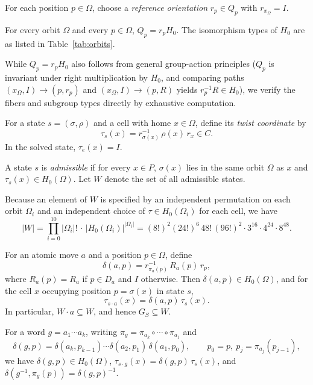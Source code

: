 \documentclass[a4paper,11pt]{article}
\begin{document}
For each position $p\in\Omega$, choose a \emph{reference orientation} $r_p\in Q_p$ with $r_{x_\Omega}=I$.

\begin{lemma}[Check C3]\label{lem:coset}
For every orbit $\Omega$ and every $p\in\Omega$, $Q_p=r_pH_0$.
The isomorphism types of $H_0$ are as listed in Table~\ref{tab:orbits}.
\end{lemma}

While $Q_p=r_pH_0$ also follows from general group-action principles ($Q_p$ is invariant under right multiplication by $H_0$, and comparing paths $(x_\Omega,I)\to(p,r_p)$ and $(x_\Omega,I)\to(p,R)$ yields $r_p^{-1}R\in H_0$), we verify the fibers and subgroup types directly by exhaustive computation.

\begin{definition}
For a state $s=(\sigma,\rho)$ and a cell with home $x\in\Omega$, define its \emph{twist coordinate} by
\[
\tau_s(x)=r_{\sigma(x)}^{-1}\,\rho(x)\,r_x\in C.
\]
In the solved state, $\tau_e(x)=I$.
\end{definition}

\begin{definition}
A state $s$ is \emph{admissible} if for every $x\in P$, $\sigma(x)$ lies in the same orbit $\Omega$ as $x$ and $\tau_s(x)\in H_0(\Omega)$. Let $W$ denote the set of all admissible states.
\end{definition}

Because an element of $W$ is specified by an independent permutation on each orbit $\Omega_i$ and an independent choice of $\tau\in H_0(\Omega_i)$ for each cell, we have
\begin{equation}\label{eq:W}
|W|=\prod_{i=0}^{10}|\Omega_i|!\,\cdot\,|H_0(\Omega_i)|^{|\Omega_i|}
=(8!)^2(24!)^6\,48!\,(96!)^2\cdot3^{16}\cdot4^{24}\cdot8^{48}.
\end{equation}

\begin{lemma}\label{lem:delta}
For an atomic move $a$ and a position $p\in\Omega$, define
\[
\delta(a,p)=r_{\pi_a(p)}^{-1}\,R_a(p)\,r_p,
\]
where $R_a(p)=R_a$ if $p\in D_a$ and $I$ otherwise.
Then $\delta(a,p)\in H_0(\Omega)$, and for the cell $x$ occupying position $p=\sigma(x)$ in state $s$,
\[
\tau_{s\cdot a}(x)=\delta(a,p)\,\tau_s(x).
\]
In particular, $W\cdot a\subseteq W$, and hence $G_S\subseteq W$.

For a word $g=a_1\cdots a_k$, writing $\pi_g=\pi_{a_k}\circ\cdots\circ\pi_{a_1}$ and
\[
\delta(g,p)=\delta(a_k,p_{k-1})\cdots\delta(a_2,p_1)\,\delta(a_1,p_0),\qquad p_0=p,\ p_j=\pi_{a_j}(p_{j-1}),
\]
we have $\delta(g,p)\in H_0(\Omega)$, $\tau_{s\cdot g}(x)=\delta(g,p)\,\tau_s(x)$, and $\delta(g^{-1},\pi_g(p))=\delta(g,p)^{-1}$.
\end{lemma}
\end{document}
